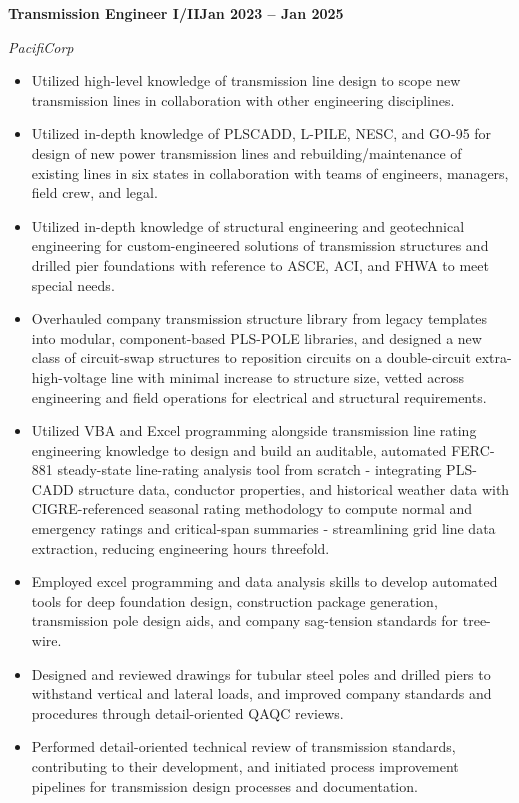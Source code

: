 \documentclass[10pt, letterpaper]{article}
\newcommand{\jobline}[2]{%
  \vspace{5pt}%
  \noindent\textbf{#1}\hfill\textbf{#2}\par%
  \vspace{1pt}%
}
\newcommand{\subline}[1]{%
  \vspace{-1pt}%
  \noindent\textit{#1}\par%
  \vspace{1pt}%
}
\newenvironment{rlist}{%
  \begin{itemize}[leftmargin=1.4em, itemsep=1pt, topsep=2pt, parsep=0pt]%
}{%
  \end{itemize}%
}
\begin{document}
\jobline{Transmission Engineer I/II}{Jan 2023 -- Jan 2025}
\subline{PacifiCorp}
\begin{rlist}
  \item Utilized high-level knowledge of transmission line design to scope new transmission lines in collaboration with other engineering disciplines.
  \item Utilized in-depth knowledge of PLSCADD, L-PILE, NESC, and GO-95 for design of new power transmission lines and rebuilding/maintenance of existing lines in six states in collaboration with teams of engineers, managers, field crew, and legal.
  \item Utilized in-depth knowledge of structural engineering and geotechnical engineering for custom-engineered solutions of transmission structures and drilled pier foundations with reference to ASCE, ACI, and FHWA to meet special needs.
  \item Overhauled company transmission structure library from legacy templates into modular, component-based PLS-POLE libraries, and designed a new class of circuit-swap structures to reposition circuits on a double-circuit extra-high-voltage line with minimal increase to structure size, vetted across engineering and field operations for electrical and structural requirements.
  \item Utilized VBA and Excel programming alongside transmission line rating engineering knowledge to design and build an auditable, automated FERC-881 steady-state line-rating analysis tool from scratch - integrating PLS-CADD structure data, conductor properties, and historical weather data with CIGRE-referenced seasonal rating methodology to compute normal and emergency ratings and critical-span summaries - streamlining grid line data extraction, reducing engineering hours threefold.
  \item Employed excel programming and data analysis skills to develop automated tools for deep foundation design, construction package generation, transmission pole design aids, and company sag-tension standards for tree-wire.
  \item Designed and reviewed drawings for tubular steel poles and drilled piers to withstand vertical and lateral loads, and improved company standards and procedures through detail-oriented QAQC reviews.
  \item Performed detail-oriented technical review of transmission standards, contributing to their development, and initiated process improvement pipelines for transmission design processes and documentation.
\end{rlist}
\end{document}
